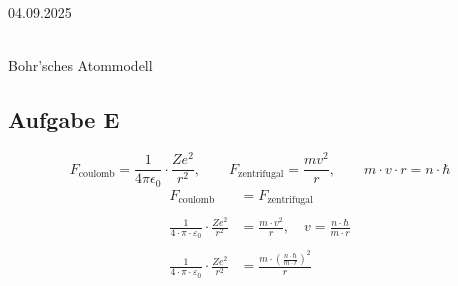 \documentclass[11pt,a4paper,oneside]{article}
\newcommand{\lessondate}[1]{\noindent\hfill\textcolor{MarginalGray}{\textsc{#1}} \\ \vspace{0.5cm}}
\begin{document}
	\lessondate{04.09.2025}\\
	\vspace{-1cm}
	\begin{loesung}{Bohr'sches Atommodell}
		\subsection*{Aufgabe E}
		\[
		\boxed{
		F_\text{coulomb} = \frac{1}{4 \pi \epsilon_0} \cdot \frac{Ze^2}{r^2}, \qquad
		F_\text{zentrifugal} = \frac{mv^2}{r}, \qquad m\cdot v \cdot r = n \cdot \hbar 
		}
		\]
		\begin{align*}
			F_\text{coulomb} &= F_\text{zentrifugal} \\\\
			\frac{1}{4 \cdot \pi \cdot \varepsilon_0} \cdot \frac{Ze^2}{r^2} &= \frac{m \cdot v^2}{r}, \quad v = \frac{n \cdot \hbar}{m \cdot r}\\\\
			\frac{1}{4 \cdot \pi \cdot \varepsilon_0} \cdot \frac{Ze^2}{r^2} &=  \frac{m \cdot \left( \frac{n \cdot \hbar}{m \cdot r}\right)^2 }{r}
		\end{align*}
	\end{loesung}
	
	\newpage
	
\end{document}
